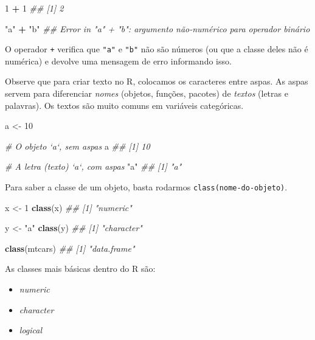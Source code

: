 \documentclass[]{book}
\newenvironment{Shaded}{\begin{snugshade}}{\end{snugshade}}
\newcommand{\CommentTok}[1]{\textcolor[rgb]{0.56,0.35,0.01}{\textit{#1}}}
\newcommand{\DecValTok}[1]{\textcolor[rgb]{0.00,0.00,0.81}{#1}}
\newcommand{\KeywordTok}[1]{\textcolor[rgb]{0.13,0.29,0.53}{\textbf{#1}}}
\newcommand{\NormalTok}[1]{#1}
\newcommand{\OperatorTok}[1]{\textcolor[rgb]{0.81,0.36,0.00}{\textbf{#1}}}
\newcommand{\StringTok}[1]{\textcolor[rgb]{0.31,0.60,0.02}{#1}}
\providecommand{\tightlist}{%
  \setlength{\itemsep}{0pt}\setlength{\parskip}{0pt}}
\begin{document}
\begin{Shaded}
\begin{Highlighting}[]
\DecValTok{1} \OperatorTok{+}\StringTok{ }\DecValTok{1}
\CommentTok{## [1] 2}


\StringTok{"a"} \OperatorTok{+}\StringTok{ "b"}
\CommentTok{## Error in "a" + "b": argumento não-numérico para operador binário}
\end{Highlighting}
\end{Shaded}

O operador \texttt{+} verifica que \texttt{"a"} e \texttt{"b"} não são números (ou que a classe deles não é numérica) e devolve uma mensagem de erro informando isso.

Observe que para criar texto no R, colocamos os caracteres entre aspas. As aspas servem para diferenciar \emph{nomes} (objetos, funções, pacotes) de \emph{textos} (letras e palavras). Os textos são muito comuns em variáveis categóricas.

\begin{Shaded}
\begin{Highlighting}[]
\NormalTok{a <-}\StringTok{ }\DecValTok{10}

\CommentTok{# O objeto `a`, sem aspas}
\NormalTok{a}
\CommentTok{## [1] 10}

\CommentTok{# A letra (texto) `a`, com aspas}
\StringTok{"a"}
\CommentTok{## [1] "a"}
\end{Highlighting}
\end{Shaded}

Para saber a classe de um objeto, basta rodarmos \texttt{class(nome-do-objeto)}.

\begin{Shaded}
\begin{Highlighting}[]
\NormalTok{x <-}\StringTok{ }\DecValTok{1}
\KeywordTok{class}\NormalTok{(x)}
\CommentTok{## [1] "numeric"}

\NormalTok{y <-}\StringTok{ "a"}
\KeywordTok{class}\NormalTok{(y)}
\CommentTok{## [1] "character"}

\KeywordTok{class}\NormalTok{(mtcars)}
\CommentTok{## [1] "data.frame"}
\end{Highlighting}
\end{Shaded}

As classes mais básicas dentro do R são:

\begin{itemize}
\tightlist
\item
  \emph{numeric}
\item
  \emph{character}
\item
  \emph{logical}
\end{itemize}
\end{document}
